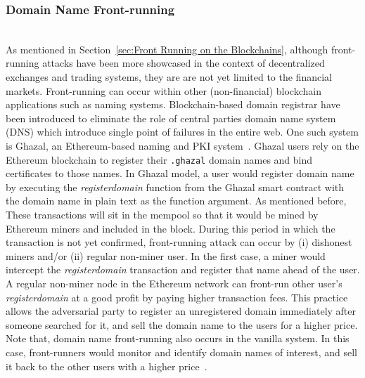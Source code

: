\subsubsection{Domain Name Front-running} \hfill\\    %
\noindent As mentioned in Section~\ref{sec:Front Running on the Blockchains}, although front-running attacks have been more showcased in the context of decentralized exchanges and trading systems, they are are not yet limited to the financial markets. Front-running can occur within other (non-financial) blockchain applications such as naming systems. Blockchain-based domain registrar have been introduced to eliminate the role of central parties \ie domain name system (DNS) which introduce single point of failures in the entire web. One such system is Ghazal, an Ethereum-based naming and PKI system~\cite{moosavighazal}. Ghazal users rely on the Ethereum blockchain to register their \texttt{.ghazal} domain names and bind certificates to those names. In Ghazal model, a user would register domain name by executing the \textit{registerdomain} function from the Ghazal smart contract with the domain name in plain text as the function argument. As mentioned before, These transactions will sit in the mempool so that it would be mined by Ethereum miners and included in the block. During this period in which the transaction is not yet confirmed, front-running attack can occur by (i) dishonest miners and/or (ii) regular non-miner user. In the first case, a miner would intercept the \textit{registerdomain} transaction and register that name ahead of the user. A regular non-miner node in the Ethereum network can front-run other user's \textit{registerdomain} at a good profit by paying higher transaction fees. This practice allows the adversarial party  to register an unregistered domain immediately after someone searched for it, and sell the domain name to the users for a higher price. Note that, domain name front-running also occurs in the vanilla system. In this case, front-runners would monitor and identify domain names of interest, and sell it back to the other users with a higher price~\cite{sac022en33:online}.







